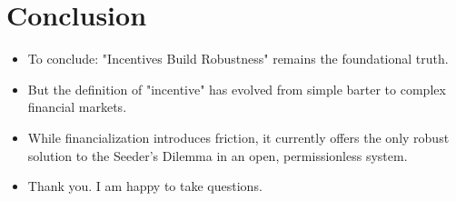 \documentclass[11pt, letterpaper]{article}
\begin{document}
\section{Conclusion}
\begin{itemize}
    \item To conclude: "Incentives Build Robustness" remains the foundational truth.
    \item But the definition of "incentive" has evolved from simple barter to complex financial markets.
    \item While financialization introduces friction, it currently offers the only robust solution to the Seeder's Dilemma in an open, permissionless system.
    \item Thank you. I am happy to take questions.
\end{itemize}
\end{document}

